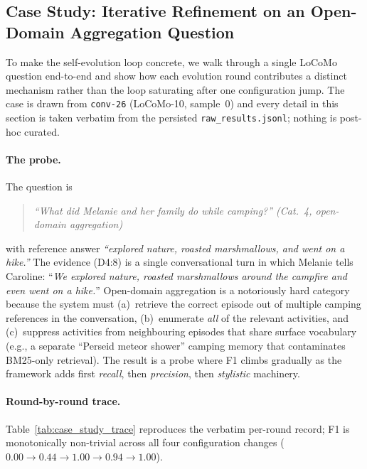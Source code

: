\subsection{Case Study: Iterative Refinement on an Open-Domain Aggregation Question}
\label{app:case_study}

To make the self-evolution loop concrete, we walk through a single LoCoMo question end-to-end and show how each evolution round contributes a distinct mechanism rather than the loop saturating after one configuration jump. The case is drawn from \texttt{conv-26} (LoCoMo-10, sample~0) and every detail in this section is taken verbatim from the persisted \texttt{raw\_results.jsonl}; nothing is post-hoc curated.

\paragraph{The probe.} The question is
\begin{quote}\itshape
``What did Melanie and her family do while camping?''  \quad (Cat.~4, open-domain aggregation)
\end{quote}
with reference answer \emph{``explored nature, roasted marshmallows, and went on a hike.''} The evidence (D4:8) is a single conversational turn in which Melanie tells Caroline: ``\emph{We explored nature, roasted marshmallows around the campfire and even went on a hike.}'' Open-domain aggregation is a notoriously hard category because the system must (a)~retrieve the correct episode out of multiple camping references in the conversation, (b)~enumerate \emph{all} of the relevant activities, and (c)~suppress activities from neighbouring episodes that share surface vocabulary (e.g., a separate ``Perseid meteor shower'' camping memory that contaminates BM25-only retrieval). The result is a probe where F1 climbs gradually as the framework adds first \emph{recall}, then \emph{precision}, then \emph{stylistic} machinery.

\paragraph{Round-by-round trace.} Table~\ref{tab:case_study_trace} reproduces the verbatim per-round record; F1 is monotonically non-trivial across all four configuration changes ($0.00 \to 0.44 \to 1.00 \to 0.94 \to 1.00$).

